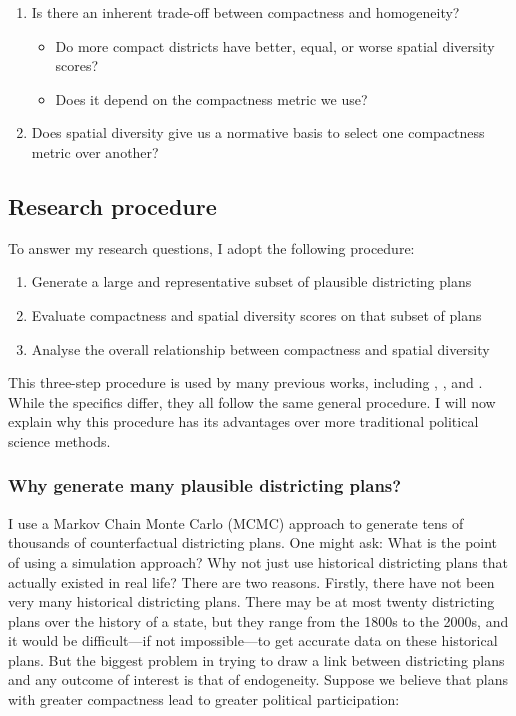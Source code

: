 \documentclass[]{article}
\providecommand{\tightlist}{%
  \setlength{\itemsep}{0pt}\setlength{\parskip}{0pt}}
\begin{document}
\begin{enumerate}
\def\labelenumi{\arabic{enumi}.}
\tightlist
\item
  Is there an inherent trade-off between compactness and homogeneity?

  \begin{itemize}
  \tightlist
  \item
    Do more compact districts have better, equal, or worse spatial
    diversity scores?
  \item
    Does it depend on the compactness metric we use?
  \end{itemize}
\item
  Does spatial diversity give us a normative basis to select one
  compactness metric over another?
\end{enumerate}

\hypertarget{research-procedure}{%
\subsection{Research procedure}\label{research-procedure}}

To answer my research questions, I adopt the following procedure:

\begin{enumerate}
\def\labelenumi{\arabic{enumi}.}
\tightlist
\item
  Generate a large and representative subset of plausible districting
  plans
\item
  Evaluate compactness and spatial diversity scores on that subset of
  plans
\item
  Analyse the overall relationship between compactness and spatial
  diversity
\end{enumerate}

This three-step procedure is used by many previous works, including
\cite{cr2013}, \cite{ddj2019comp}, and \cite{s2020}. While the specifics
differ, they all follow the same general procedure. I will now explain
why this procedure has its advantages over more traditional political
science methods.

\hypertarget{why-generate-many-plausible-districting-plans}{%
\subsubsection{Why generate many plausible districting
plans?}\label{why-generate-many-plausible-districting-plans}}

I use a Markov Chain Monte Carlo (MCMC) approach to generate tens of
thousands of counterfactual districting plans. One might ask: What is
the point of using a simulation approach? Why not just use historical
districting plans that actually existed in real life? There are two
reasons. Firstly, there have not been very many historical districting
plans. There may be at most twenty districting plans over the history of
a state, but they range from the 1800s to the 2000s, and it would be
difficult---if not impossible---to get accurate data on these historical
plans. But the biggest problem in trying to draw a link between
districting plans and any outcome of interest is that of endogeneity.
Suppose we believe that plans with greater compactness lead to greater
political participation:
\end{document}
